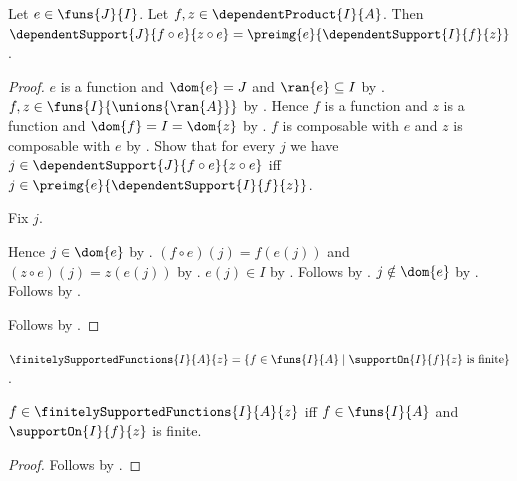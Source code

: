 \begin{theorem}\label{spike_dependent_support_precomposition}
    Let $e\in\funs{J}{I}$.
    Let $f,z\in\dependentProduct{I}{A}$.
    Then
        $\dependentSupport{J}{f\circ e}{z\circ e}
            =\preimg{e}{\dependentSupport{I}{f}{z}}$.
\end{theorem}
\begin{proof}
    $e$ is a function and $\dom{e}=J$ and $\ran{e}\subseteq I$ by
        .
    $f,z\in\funs{I}{\unions{\ran{A}}}$ by
        .
    Hence $f$ is a function and $z$ is a function and
        $\dom{f}=I=\dom{z}$ by
        .
    $f$ is composable with $e$ and $z$ is composable with $e$ by
        \auto.
    Show that for every $j$ we have
        $j\in\dependentSupport{J}{f\circ e}{z\circ e}$ iff
        $j\in\preimg{e}{\dependentSupport{I}{f}{z}}$.
    \begin{subproof}
        Fix $j$.
        \begin{byCase}
            Hence $j\in\dom{e}$ by \auto.
            $(f\circ e)(j)=f(e(j))$ and
                $(z\circ e)(j)=z(e(j))$ by
                .
            $e(j)\in I$ by .
            Follows by
                .
            $j\notin\dom{e}$ by \auto.
            Follows by
                .
        \end{byCase}
    \end{subproof}
    Follows by .
\end{proof}

\begin{definition}\label{spike_finitely_supported_functions}
    $\finitelySupportedFunctions{I}{A}{z}
        =\{f\in\funs{I}{A}\mid
            \text{$\supportOn{I}{f}{z}$ is finite}\}$.
\end{definition}

\begin{proposition}\label{spike_finitely_supported_functions_iff}
    $f\in\finitelySupportedFunctions{I}{A}{z}$ iff
        $f\in\funs{I}{A}$ and $\supportOn{I}{f}{z}$ is finite.
\end{proposition}
\begin{proof}
    Follows by .
\end{proof}

